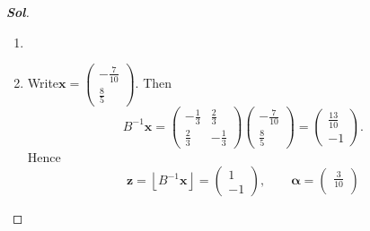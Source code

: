 \begin{enumerate}
\begin{proof}[\normalfont\color{magenta}\bfseries Sol]
\begin{enumerate}
\[		=
		\begin{pmatrix}
			4\\
			5
		\end{pmatrix}\quad\text{and}\quad
		\mathbf p=B\boldsymbol\alpha
		=
		\begin{pmatrix}
			1&2\\
			2&1
		\end{pmatrix}
		\begin{pmatrix}
			0\\[2pt]
			\frac1{10}
		\end{pmatrix}
		=
		\begin{pmatrix}
			\frac15\\[2pt]
			\frac1{10}
		\end{pmatrix}.
		\]
		So
		\[
		\boxed{
			\begin{pmatrix}
				4.2\\
				5.1
			\end{pmatrix}
			=
			\begin{pmatrix}
				4\\
				5
			\end{pmatrix}
			+
			\begin{pmatrix}
				\frac15\\[2pt]
				\frac1{10}
			\end{pmatrix}.
		}
		\]
		\item[]
		\item Write$
		\mathbf x=
		\begin{pmatrix}
			-\frac7{10}\\[2pt]
			\frac85
		\end{pmatrix}$. Then
		\[
		B^{-1}\mathbf x
		=
		\begin{pmatrix}
			-\frac13&\frac23\\[4pt]
			\frac23&-\frac13
		\end{pmatrix}
		\begin{pmatrix}
			-\frac7{10}\\[2pt]
			\frac85
		\end{pmatrix}
		=
		\begin{pmatrix}
			\frac{13}{10}\\[2pt]
			-1
		\end{pmatrix}.
		\]
		Hence
		\[
		\mathbf z=\left\lfloor B^{-1}\mathbf x\right\rfloor
		=
		\begin{pmatrix}
			1\\
			-1
		\end{pmatrix},
		\qquad
		\boldsymbol\alpha
		=
		\begin{pmatrix}
			\frac3{10}\\[2pt]

\end{pmatrix}\]
\end{enumerate}
\end{proof}
\end{enumerate}
